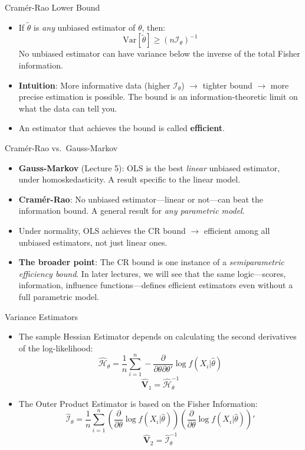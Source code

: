 \documentclass[aspectratio=169, handout, t]{beamer}
\numberwithin{equation}{section}
\begin{document}
\begin{frame}{Cram\'{e}r-Rao Lower Bound}
\begin{itemize}
\item If $\tilde{\theta}$ is \emph{any} unbiased estimator of $\theta$, then:
$$\text{Var}[\tilde{\theta}]\geq (n\mathcal{I}_\theta)^{-1}$$
No unbiased estimator can have variance below the inverse of the total Fisher information.\pause
\item \textbf{Intuition}: More informative data (higher $\mathcal{I}_\theta$) $\to$ tighter bound $\to$ more precise estimation is possible. The bound is an information-theoretic limit on what the data can tell you.\pause
\item An estimator that achieves the bound is called \textbf{efficient}.
\end{itemize}
\end{frame}

\begin{frame}{Cram\'{e}r-Rao vs.\ Gauss-Markov}
\begin{itemize}
\item \textbf{Gauss-Markov} (Lecture 5): OLS is the best \emph{linear} unbiased estimator, under homoskedasticity.  A result specific to the linear model.\pause
\item \textbf{Cram\'{e}r-Rao}: No unbiased estimator---linear or not---can beat the information bound. A general result for \emph{any parametric model}.\pause
\item Under normality, OLS achieves the CR bound $\to$ efficient among \alert{all} unbiased estimators, not just linear ones.\pause
\item \textbf{The broader point}: The CR bound is one instance of a \emph{semiparametric efficiency bound}.  In later lectures, we will see that the same logic---scores, information, influence functions---defines efficient estimators even without a full parametric model.
\end{itemize}
\end{frame}



\begin{frame}{Variance Estimators}

\begin{itemize}
\item The sample Hessian Estimator depends on calculating the second derivatives of the log-likelihood:
$$\hat{\mathcal{H}}_\theta=\frac{1}{n}\sum_{i=1}^n - \frac{\partial}{\partial \theta\partial \theta'} \log f(X_i|\hat{\theta})$$
$$\hat{\mathbf{V}}_1=\hat{\mathcal{H}}_\theta^{-1}$$\pause
 \item The Outer Product Estimator is based on the Fisher Information:
 $$\hat{\mathcal{I}}_\theta=\frac{1}{n}\sum_{i=1}^n(\frac{\partial}{\partial \theta} \log f(X_i|\hat{\theta}))(\frac{\partial}{\partial \theta} \log f(X_i|\hat{\theta}))'$$
$$\hat{\mathbf{V}}_2=\hat{\mathcal{I}}_\theta^{-1}$$

 \end{itemize}
\end{frame}
\end{document}
